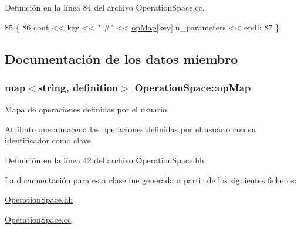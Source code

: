 Definición en la línea 84 del archivo Operation\+Space.\+cc.


\begin{DoxyCode}
85 \{
86   cout << key << \textcolor{stringliteral}{" #"} << \hyperlink{class_operation_space_aae64cd370655d6b2fb3f2305c5a520a7}{opMap}[key].n\_parameters << endl;
87 \}\end{DoxyCode}


\subsection{Documentación de los datos miembro}
\subsubsection[{\texorpdfstring{op\+Map}{opMap}}]{\setlength{\rightskip}{0pt plus 5cm}map$<$string, {\bf definition}$>$ Operation\+Space\+::op\+Map\hspace{0.3cm}{\ttfamily [private]}}\hypertarget{class_operation_space_aae64cd370655d6b2fb3f2305c5a520a7}{}\label{class_operation_space_aae64cd370655d6b2fb3f2305c5a520a7}


Mapa de operaciones definidas por el usuario. 

Atributo que almacena las operaciones definidas por el usuario con su identificador como clave 

Definición en la línea 42 del archivo Operation\+Space.\+hh.



La documentación para esta clase fue generada a partir de los siguientes ficheros\+:\begin{DoxyCompactItemize}
\item 
\hyperlink{_operation_space_8hh}{Operation\+Space.\+hh}\item 
\hyperlink{_operation_space_8cc}{Operation\+Space.\+cc}\end{DoxyCompactItemize}
